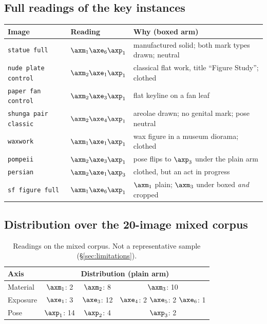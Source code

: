 \subsection{Full readings of the key instances}
\label{app:key}

\begin{table}[H]
\centering\small
\begin{tabularx}{\linewidth}{@{}p{2.55cm}lX@{}}
\toprule
Image & Reading & Why (boxed arm) \\
\midrule
\texttt{statue full} & $\axm_1\axe_6\axp_1$ & manufactured solid; both mark types drawn; neutral \\
\texttt{nude plate control} & $\axm_2\axe_1\axp_1$ & classical flat work, title ``Figure Study''; clothed \\
\texttt{paper fan control} & $\axm_2\axe_3\axp_1$ & flat keyline on a fan leaf \\
\texttt{shunga pair classic} & $\axm_2\axe_4\axp_1$ & areolae drawn; no genital mark; pose neutral \\
\texttt{waxwork} & $\axm_1\axe_1\axp_1$ & wax figure in a museum diorama; clothed \\
\texttt{pompeii} & $\axm_2\axe_3\axp_1$ & pose flips to $\axp_3$ under the plain arm \\
\texttt{persian} & $\axm_2\axe_1\axp_3$ & clothed, but an act in progress \\
\texttt{sf figure full} & $\axm_1\axe_6\axp_1$ & $\axm_1$ plain; $\axm_3$ under boxed \emph{and} cropped \\
\bottomrule
\end{tabularx}
\end{table}

\subsection{Distribution over the 20-image mixed corpus}

\begin{table}[H]
\centering\small
\begin{tabular}{@{}lccc@{}}
\toprule
Axis & \multicolumn{3}{c}{Distribution (plain arm)} \\
\midrule
Material & $\axm_1$: 2 & $\axm_2$: 8 & $\axm_3$: 10 \\
Exposure & $\axe_1$: 3 & $\axe_3$: 12 & $\axe_4$: 2 \quad $\axe_5$: 2 \quad $\axe_6$: 1 \\
Pose & $\axp_1$: 14 & $\axp_2$: 4 & $\axp_3$: 2 \\
\bottomrule
\end{tabular}
\caption{Readings on the mixed corpus. Not a representative sample
(\S\ref{sec:limitations}).}
\label{tab:mixdist}
\end{table}

